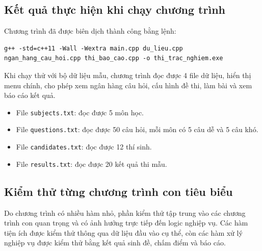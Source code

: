 \documentclass[12pt,a4paper]{article}
\begin{document}
\subsection{Kết quả thực hiện khi chạy chương trình}

Chương trình đã được biên dịch thành công bằng lệnh:

\begin{lstlisting}[style=cppstyle, caption={Lệnh biên dịch chương trình}]
g++ -std=c++11 -Wall -Wextra main.cpp du_lieu.cpp ngan_hang_cau_hoi.cpp thi_bao_cao.cpp -o thi_trac_nghiem.exe
\end{lstlisting}

Khi chạy thử với bộ dữ liệu mẫu, chương trình đọc được 4 file dữ liệu, hiển thị menu chính, cho phép xem ngân hàng câu hỏi, cấu hình đề thi, làm bài và xem báo cáo kết quả.

\begin{itemize}
    \item File \texttt{subjects.txt}: đọc được 5 môn học.
    \item File \texttt{questions.txt}: đọc được 50 câu hỏi, mỗi môn có 5 câu dễ và 5 câu khó.
    \item File \texttt{candidates.txt}: đọc được 12 thí sinh.
    \item File \texttt{results.txt}: đọc được 20 kết quả thi mẫu.
\end{itemize}

\subsection{Kiểm thử từng chương trình con tiêu biểu}

Do chương trình có nhiều hàm nhỏ, phần kiểm thử tập trung vào các chương trình con quan trọng và có ảnh hưởng trực tiếp đến logic nghiệp vụ. Các hàm tiện ích được kiểm thử thông qua dữ liệu đầu vào cụ thể, còn các hàm xử lý nghiệp vụ được kiểm thử bằng kết quả sinh đề, chấm điểm và báo cáo.
\end{document}
